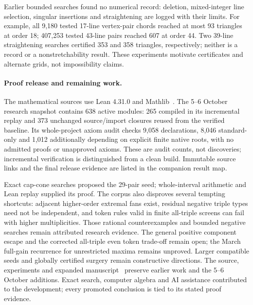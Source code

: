 Earlier bounded searches found no numerical record: deletion, mixed-integer line selection, singular insertions and straightening are logged with their limits. For example, all 9,180 tested 17-line vertex-pair chords reached at most 93 triangles at order 18; 407,253 tested 43-line pairs reached 607 at order 44. Two 39-line straightening searches certified 353 and 358 triangles, respectively; neither is a record or a nonstretchability result. These experiments motivate certificates and alternate grids, not impossibility claims.

\paragraph{Proof release and remaining work.}
The mathematical sources use Lean 4.31.0 and Mathlib~\cite{lean4,mathlib}. The 5--6 October research snapshot contains 638 active modules: 265 compiled in its incremental replay and 373 unchanged source/import closures reused from the verified baseline. Its whole-project axiom audit checks 9,058 declarations, 8,046 standard-only and 1,012 additionally depending on explicit finite native roots, with no admitted proofs or unapproved axioms. These are audit counts, not discoveries; incremental verification is distinguished from a clean build. Immutable source links and the final release evidence are listed in the companion result map.

Exact cap-cone searches proposed the 29-pair seed; whole-interval arithmetic and Lean replay supplied its proof. The corpus also disproves several tempting shortcuts: adjacent higher-order extremal fans exist, residual negative triple types need not be independent, and token rules valid in finite all-triple screens can fail with higher multiplicities. Those rational counterexamples and bounded negative searches remain attributed research evidence. The general positive component escape and the corrected all-triple even token trade-off remain open; the March full-gain recurrence for unrestricted maxima remains unproved. Larger compatible seeds and globally certified surgery remain constructive directions. The source, experiments and expanded manuscript~\cite{zarzueloRepository,zarzueloFull2026} preserve earlier work and the 5--6 October additions. Exact search, computer algebra and AI assistance contributed to the development; every promoted conclusion is tied to its stated proof evidence.
